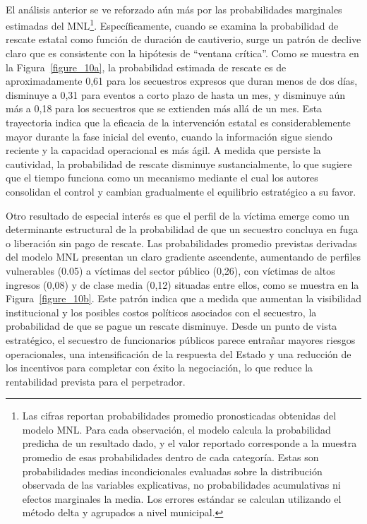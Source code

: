 \documentclass[12pt]{article}
\theoremstyle{definition}
\theoremstyle{remark}
\newcommand{\1}{\mathbf{1}}
\begin{document}
\

El análisis anterior se ve reforzado aún más por las probabilidades marginales estimadas del MNL\footnote{Las cifras reportan probabilidades promedio pronosticadas obtenidas del modelo MNL. Para cada observación, el modelo calcula la probabilidad predicha de un resultado dado, y el valor reportado corresponde a la muestra promedio de esas probabilidades dentro de cada categoría. Estas son probabilidades medias incondicionales evaluadas sobre la distribución observada de las variables explicativas, no probabilidades acumulativas ni efectos marginales la media. Los errores estándar se calculan utilizando el método delta y agrupados a nivel municipal.}. Específicamente, cuando se examina la probabilidad de rescate estatal como función de duración de cautiverio, surge un patrón de declive claro que es consistente con la hipótesis de “ventana crítica”. Como se muestra en la Figura~\ref{figure_10a}, la probabilidad estimada de rescate es de aproximadamente 0,61 para los secuestros expresos que duran menos de dos días, disminuye a 0,31 para eventos a corto plazo de hasta un mes, y disminuye aún más a 0,18 para los secuestros que se extienden más allá de un mes. Esta trayectoria indica que la eficacia de la intervención estatal es considerablemente mayor durante la fase inicial del evento, cuando la información sigue siendo reciente y la capacidad operacional es más ágil. A medida que persiste la cautividad, la probabilidad de rescate disminuye sustancialmente, lo que sugiere que el tiempo funciona como un mecanismo mediante el cual los autores consolidan el control y cambian gradualmente el equilibrio estratégico a su favor.

Otro resultado de especial interés es que el perfil de la víctima emerge como un determinante estructural de la probabilidad de que un secuestro concluya en fuga o liberación sin pago de rescate. Las probabilidades promedio previstas derivadas del modelo MNL presentan un claro gradiente ascendente, aumentando de perfiles vulnerables (0.05) a víctimas del sector público (0,26), con víctimas de altos ingresos (0,08) y de clase media (0,12) situadas entre ellos, como se muestra en la Figura~\ref{figure_10b}. Este patrón indica que a medida que aumentan la visibilidad institucional y los posibles costos políticos asociados con el secuestro, la probabilidad de que se pague un rescate disminuye. Desde un punto de vista estratégico, el secuestro de funcionarios públicos parece entrañar mayores riesgos operacionales, una intensificación de la respuesta del Estado y una reducción de los incentivos para completar con éxito la negociación, lo que reduce la rentabilidad prevista para el perpetrador.
\end{document}
